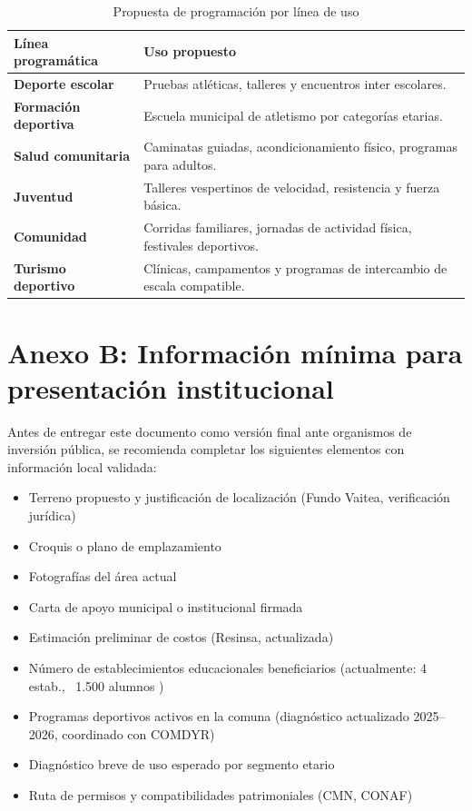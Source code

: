 \documentclass[12pt, a4paper]{article}
\begin{document}
\begin{table}[h!]
\centering
\caption{Propuesta de programación por línea de uso}
\begin{tabularx}{\linewidth}{>{\bfseries}p{3.5cm}X}
\toprule
\textbf{Línea programática} & \textbf{Uso propuesto} \\
\midrule
Deporte escolar & Pruebas atléticas, talleres y encuentros inter escolares. \\
Formación deportiva & Escuela municipal de atletismo por categorías etarias. \\
Salud comunitaria & Caminatas guiadas, acondicionamiento físico, programas para adultos. \\
Juventud & Talleres vespertinos de velocidad, resistencia y fuerza básica. \\
Comunidad & Corridas familiares, jornadas de actividad física, festivales deportivos. \\
Turismo deportivo & Clínicas, campamentos y programas de intercambio de escala compatible. \\
\bottomrule
\end{tabularx}
\end{table}

\section*{Anexo B: Información mínima para presentación institucional}

Antes de entregar este documento como versión final ante organismos de inversión
pública, se recomienda completar los siguientes elementos con información local
validada:

\begin{itemize}[leftmargin=*, itemsep=3pt]
  \item Terreno propuesto y justificación de localización (Fundo Vaitea, verificación jurídica)
  \item Croquis o plano de emplazamiento
  \item Fotografías del área actual
  \item Carta de apoyo municipal o institucional firmada
  \item Estimación preliminar de costos (Resinsa, actualizada)
  \item Número de establecimientos educacionales beneficiarios (actualmente: 4 estab., ~1.500 alumnos \citep{BCN2025})
  \item Programas deportivos activos en la comuna (diagnóstico actualizado 2025--2026, coordinado con COMDYR)
  \item Diagnóstico breve de uso esperado por segmento etario
  \item Ruta de permisos y compatibilidades patrimoniales (CMN, CONAF)
\end{itemize}
\end{document}
